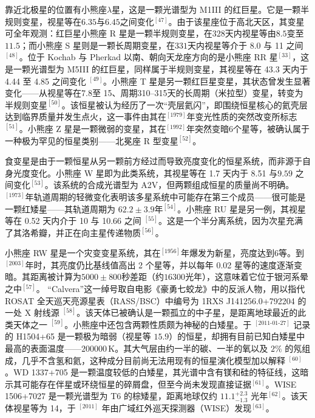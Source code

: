 靠近北极星的位置有小熊座$\lambda$星，这是一颗光谱型为 M1III 的红巨星。它是一颗半规则变星，视星等在$6.35$与$6.45$之间变化$^{[47]}$。由于该星座位于高北天区，其变星可全年观测：红巨星小熊座 R 星是一颗半规则变星，在$328$天内视星等由$8.5$变至$11.5$；而小熊座 S 星则是一颗长周期变星，在$331$天内视星等介于 8.0 与 11 之间$^{[48]}$。位于 Kochab 与 Pherkad 以南、朝向天龙座方向的是小熊座 RR 星$^{[33]}$，这是一颗光谱型为 M5III 的红巨星，同样属于半规则变星，其视星等在 43.3 天内于 4.44 至 4.85 之间变化 $^{[49]}$。小熊座 T 星是另一颗红巨星变星，其状态曾发生显著变化——从视星等在7.8至 15、周期310--315天的长周期（米拉型）变星，转变为半规则变星$^{[50]}$。该恒星被认为经历了一次“壳层氦闪”，即围绕恒星核心的氦壳层达到临界质量并发生点火，这一事件由其在$^{[1979]}$年变光性质的突然改变所标志$^{[51]}$。小熊座 Z 星是一颗微弱的变星，其在$^{[1992]}$年突然变暗$6$个星等，被确认属于一种极为罕见的恒星类别——北冕座 R 型变星$^{[52]}$。

食变星是由于一颗恒星从另一颗前方经过而导致亮度变化的恒星系统，而非源于自身光度变化。小熊座 W 星即为此类系统，其视星等在 1.7 天内于 8.51 与$9.59$ 之间变化$^{[53]}$。该系统的合成光谱型为 A2V，但两颗组成恒星的质量尚不明确。$^{[1973]}$年轨道周期的轻微变化表明该多星系统中可能存在第三个成员——很可能是一颗红矮星——其轨道周期为 $62.2\pm3.9$年$^{[54]}$。小熊座 RU 星是另一例，其视星等在 0.52 天内介于 10 与 10.66 之间 $^{[55]}$。这是一个半分离系统，因为次星充满了其洛希瓣，并正在向主星传递物质$^{[56]}$。

小熊座 RW 星是一个灾变变星系统，其在$^{[1956]}$年爆发为新星，亮度达到$6$等。到$^{[2003]}$年时，其亮度仍比基线值高出 2 个星等，并以每年 0.02 星等的速度逐渐变暗。其距离被计算为$5000\pm800$秒差距（约$16300$光年），这意味着它位于银河系晕之中$^{[57]}$。
“Calvera”这一绰号取自电影《豪勇七蛟龙》中的反派人物，用以指代 ROSAT 全天巡天亮源星表（RASS/BSC）中编号为 1RXS J141256.0+792204 的一处 X 射线源 $^{[58]}$。该天体已被确认是一颗孤立的中子星，是距离地球最近的此类天体之一 $^{[59]}$。小熊座中还包含两颗性质颇为神秘的白矮星。于 $^{[2011\text{-}01\text{-}27]}$ 记录的 H1504+65 是一颗极为暗弱（视星等 $15.9$）的恒星，却拥有目前已知白矮星中最高的表面温度——$200000\,\mathrm{K}$。其大气层由约一半的碳、一半的氧以及 $2\%$ 的氖组成，几乎不含氢和氦，这种成分目前尚无法用现有的恒星演化模型加以解释 $^{[60]}$。WD 1337+705 是一颗温度较低的白矮星，其光谱中含有镁和硅的特征线，这暗示其可能存在伴星或环绕恒星的碎屑盘，但至今尚未发现直接证据$^{[61]}$。WISE 1506+7027 是一颗光谱型为 T6 的棕矮星，距离地球仅约 $11.1^{+2.3}_{-1.3}$ 光年$^{[62]}$。该天体视星等为 14，于 $^{[2011]}$ 年由广域红外巡天探测器（WISE）发现$^{[63]}$。

